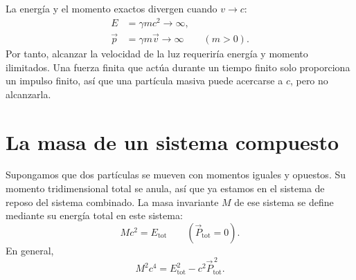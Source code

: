 \begin{classroomqa}
\end{classroomqa}

La energía y el momento exactos divergen cuando \(v\to c\):
\begin{equation}
\begin{aligned}
E&=\gamma mc^2\longrightarrow\infty,\\
\vec p&=\gamma m\vec v\longrightarrow\infty
\qquad(m>0).
\end{aligned}
\end{equation}
Por tanto, alcanzar la velocidad de la luz requeriría energía y momento ilimitados. Una fuerza finita que actúa durante un tiempo finito solo proporciona un impulso finito, así que una partícula masiva puede acercarse a \(c\), pero no alcanzarla.

\begin{classroomqa}
\end{classroomqa}

\section{La masa de un sistema compuesto}

Supongamos que dos partículas se mueven con momentos iguales y opuestos. Su momento tridimensional total se anula, así que ya estamos en el sistema de reposo del sistema combinado. La masa invariante \(M\) de ese sistema se define mediante su energía total en este sistema:
\begin{equation}
Mc^2=E_{\mathrm{tot}}
\qquad
(\vec P_{\mathrm{tot}}=0).
\end{equation}
En general,
\begin{equation}
M^2c^4
=
E_{\mathrm{tot}}^2-c^2\vec P_{\mathrm{tot}}^{\,2}.
\label{eq:sr3-composite-mass}
\end{equation}

